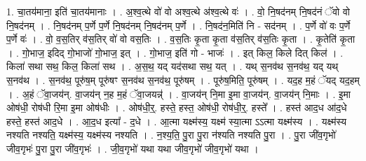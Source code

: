 \documentclass[17pt]{extarticle}
\begin{document}
1. चा॒तय॑माना॒ इति॑ चा॒तय॑मानाः । . अ॒श्व॒त्थे वो॑ वो अश्व॒त्थे अ॑श्व॒त्थे वः॑ । . वो॒ नि॒षद॑नम् नि॒षद॑नं ॅवो वो नि॒षद॑नम् । . नि॒षद॑नम् प॒र्णे प॒र्णे नि॒षद॑नम् नि॒षद॑नम् प॒र्णे । . नि॒षद॑न॒मिति॑ नि - सद॑नम् । . प॒र्णे वो॑ वः प॒र्णे प॒र्णे वः॑ । . वो॒ व॒स॒तिर् व॑स॒तिर् वो॑ वो वस॒तिः । . व॒स॒तिः कृ॒ता कृ॒ता व॑स॒तिर् व॑स॒तिः कृ॒ता । . कृ॒तेति॑ कृ॒ता । . गो॒भाज॒ इदिद् गो॒भाजो॑ गो॒भाज॒ इत् । . गो॒भाज॒ इति॑ गो - भाजः॑ । . इत् किल॒ किले दित् किल॑ । . किला॑ सथा सथ॒ किल॒ किला॑ सथ । . अ॒स॒थ॒ यद् यद॑सथा सथ॒ यत् । . यथ् स॒नव॑थ स॒नव॑थ॒ यद् यथ् स॒नव॑थ । . स॒नव॑थ॒ पूरु॑ष॒म् पूरु॑षꣳ स॒नव॑थ स॒नव॑थ॒ पूरु॑षम् । . पूरु॑ष॒मिति॒ पूरु॑षम् । . यद॒ह म॒हं ॅयद् यद॒हम् । . अ॒हं ॅवा॒जय॑न्. वा॒जय॑न् न॒ह म॒हं ॅवा॒जयन्न्॑ । . वा॒जय॑न् नि॒मा इ॒मा वा॒जय॑न्. वा॒जय॑न् नि॒माः । . इ॒मा ओष॑धी॒ रोष॑धी रि॒मा इ॒मा ओष॑धीः । . ओष॑धी॒र्॒. हस्ते॒ हस्त॒ ओष॑धी॒ रोष॑धी॒र्॒. हस्ते᳚ । . हस्त॑ आद॒ध आ॑द॒धे हस्ते॒ हस्त॑ आद॒धे । . आ॒द॒ध इत्या᳚ - द॒धे । . आ॒त्मा यक्ष्म॑स्य॒ यक्ष्म॑ स्या॒त्मा ऽऽत्मा यक्ष्म॑स्य । . यक्ष्म॑स्य नश्यति नश्यति॒ यक्ष्म॑स्य॒ यक्ष्म॑स्य नश्यति । . न॒श्य॒ति॒ पु॒रा पु॒रा न॑श्यति नश्यति पु॒रा । . पु॒रा जी॑व॒गृभो॑ जीव॒गृभः॑ पु॒रा पु॒रा जी॑व॒गृभः॑ । . जी॒व॒गृभो॑ यथा यथा जीव॒गृभो॑ जीव॒गृभो॑ यथा । \newline
\end{document}
